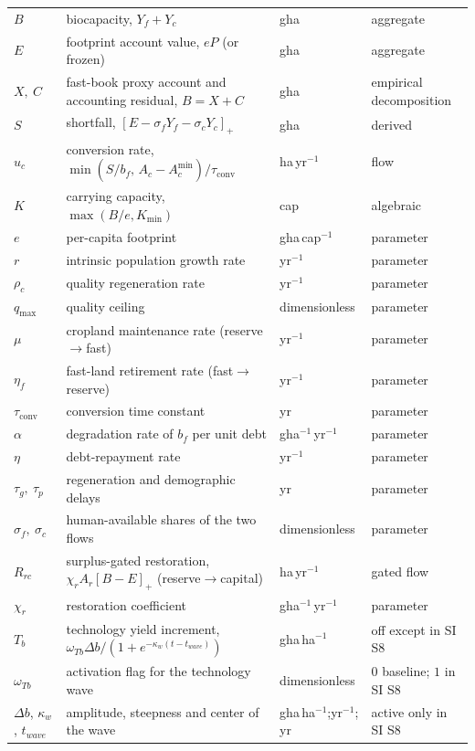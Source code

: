 \documentclass[11pt,a4paper]{article}
\newcommand{\pos}[1]{\left[#1\right]_+}
\newcommand{\Acmin}{A_c^{\min}}
\newcommand{\tconv}{\tau_{\mathrm{conv}}}
\begin{document}
\begin{longtable}{>{\raggedright\arraybackslash}p{}>{\raggedright\arraybackslash}p{}>{\raggedright\arraybackslash}p{}>{\raggedright\arraybackslash}p{}}
$B$ & biocapacity, $Y_f+Y_c$ & gha & aggregate \\
$E$ & footprint account value, $eP$ (or frozen) & gha & aggregate \\
$X,\ C$ & fast-book proxy account and accounting residual, $B=X+C$ & gha & empirical decomposition \\
$S$ & shortfall, $\pos{E-\sigma_fY_f-\sigma_cY_c}$ & gha & derived \\
$u_c$ & conversion rate, $\min(S/b_f,\,A_c-\Acmin)/\tconv$ & ha\,yr$^{-1}$ & flow \\
$K$ & carrying capacity, $\max(B/e,K_{\min})$ & cap & algebraic \\
$e$ & per-capita footprint & gha\,cap$^{-1}$ & parameter \\
$r$ & intrinsic population growth rate & yr$^{-1}$ & parameter \\
$\rho_c$ & quality regeneration rate & yr$^{-1}$ & parameter \\
$q_{\max}$ & quality ceiling & dimensionless & parameter \\
$\mu$ & cropland maintenance rate (reserve$\to$fast) & yr$^{-1}$ & parameter \\
$\eta_f$ & fast-land retirement rate (fast$\to$reserve) & yr$^{-1}$ & parameter \\
$\tconv$ & conversion time constant & yr & parameter \\
$\alpha$ & degradation rate of $b_f$ per unit debt & gha$^{-1}$\,yr$^{-1}$ & parameter \\
$\eta$ & debt-repayment rate & yr$^{-1}$ & parameter \\
$\tau_g,\ \tau_p$ & regeneration and demographic delays & yr & parameter \\
$\sigma_f,\ \sigma_c$ & human-available shares of the two flows & dimensionless & parameter \\
$R_{rc}$ & surplus-gated restoration, $\chi_rA_r\pos{B-E}$ (reserve$\to$capital) & ha\,yr$^{-1}$ & gated flow \\
$\chi_r$ & restoration coefficient & gha$^{-1}$\,yr$^{-1}$ & parameter \\
$T_b$ & technology yield increment, $\omega_{Tb}\Delta b/(1+e^{-\kappa_w(t-t_{wave})})$ & gha\,ha$^{-1}$ & off except in SI S8 \\
$\omega_{Tb}$ & activation flag for the technology wave & dimensionless & $0$ baseline; $1$ in SI S8 \\
$\Delta b$, $\kappa_w$, $t_{wave}$ & amplitude, steepness and center of the wave & gha\,ha$^{-1}$;\newline yr$^{-1}$; yr & active only in SI S8 \\

\end{longtable}
\end{document}
